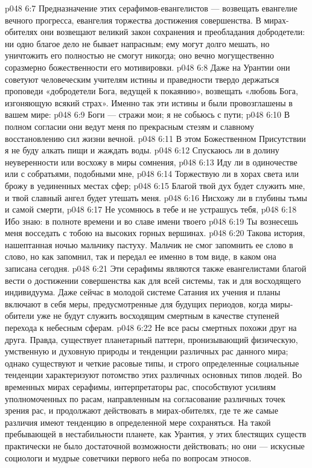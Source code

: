 \vs p048 6:7 \pc Предназначение этих серафимов\hyp{}евангелистов --- возвещать евангелие вечного прогресса, евангелия торжества достижения совершенства. В мирах\hyp{}обителях они возвещают великий закон сохранения и преобладания добродетели: ни одно благое дело не бывает напрасным; ему могут долго мешать, но уничтожить его полностью не смогут никогда; оно вечно могущественно соразмерно божественности его мотивировки.
\vs p048 6:8 Даже на Урантии они советуют человеческим учителям истины и праведности твердо держаться проповеди «добродетели Бога, ведущей к покаянию», возвещать «любовь Бога, изгоняющую всякий страх». Именно так эти истины и были провозглашены в вашем мире:
\vs p048 6:9 Боги --- стражи мои; я не собьюсь с пути;
\vs p048 6:10 В полном согласии они ведут меня по прекрасным стезям и славному восстановлению сил жизни вечной.
\vs p048 6:11 В этом Божественном Присутствии я не буду алкать пищи и жаждать воды.
\vs p048 6:12 Спускаюсь ли в долину неуверенности или восхожу в миры сомнения,
\vs p048 6:13 Иду ли в одиночестве или с собратьями, подобными мне,
\vs p048 6:14 Торжествую ли в хорах света или брожу в уединенных местах сфер;
\vs p048 6:15 Благой твой дух будет служить мне, и твой славный ангел будет утешать меня.
\vs p048 6:16 Нисхожу ли в глубины тьмы и самой смерти,
\vs p048 6:17 Не усомнюсь в тебе и не устрашусь тебя,
\vs p048 6:18 Ибо знаю: в полноте времени и во славе имени твоего
\vs p048 6:19 Ты вознесешь меня восседать с тобою на высоких горных вершинах.
\vs p048 6:20 \pc Такова история, нашептанная ночью мальчику пастуху. Мальчик не смог запомнить ее слово в слово, но как запомнил, так и передал ее именно в том виде, в каком она записана сегодня.
\vs p048 6:21 Эти серафимы являются также евангелистами благой вести о достижении совершенства как для всей системы, так и для восходящего индивидуума. Даже сейчас в молодой системе Сатания их учения и планы включают в себя меры, предусмотренные для будущих периодов, когда миры\hyp{}обители уже не будут служить восходящим смертным в качестве ступеней перехода к небесным сферам.
\vs p048 6:22 \bibnobreakspace {} Не все расы смертных похожи друг на друга. Правда, существует планетарный паттерн, пронизывающий физическую, умственную и духовную природы и тенденции различных рас данного мира; однако существуют и четкие расовые типы, и строго определенные социальные тенденции характеризуют потомство этих различных основных типов людей. Во временных мирах серафимы, интерпретаторы рас, способствуют усилиям уполномоченных по расам, направленным на согласование различных точек зрения рас, и продолжают действовать в мирах\hyp{}обителях, где те же самые различия имеют тенденцию в определенной мере сохраняться. На такой пребывающей в нестабильности планете, как Урантия, у этих блестящих существ практически не было достаточной возможности действовать; но они --- искусные социологи и мудрые советчики первого неба по вопросам этносов.
